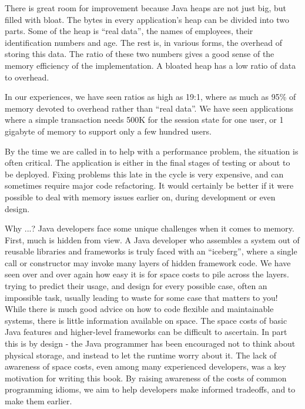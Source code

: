 There is great room for improvement because Java heaps are not just big, but
filled with bloat. The bytes in every application's heap can be divided into two
parts. Some of the heap is ``real data'', the names of employees, their
identification numbers and age. The rest is, in various forms, the overhead of
storing this data. The ratio of these two numbers gives a good sense of the
memory efficiency of the implementation. A bloated heap has a low ratio of data
to overhead.

In our experiences, we have seen ratios as high as 19:1, where as much as 95\%
of memory devoted to overhead rather than "`real data"'.
We have seen applications where a simple transaction needs 500K for the session
state for one user, or 1 gigabyte of memory to support only a few hundred users.

By the time we are called in to help with a performance problem, the situation
is often critical. The application is either in the final stages of testing or
about to be deployed. Fixing problems this late in the cycle is very expensive,
and can sometimes require major code refactoring. It would certainly be better
if it were possible to deal with memory issues earlier on, during development or
even design.

Why ...? Java developers face some unique challenges when it comes to memory.
First, much is hidden from view. A Java developer who assembles a system out of
reusable libraries and frameworks is truly faced with an "`iceberg"', where a
single call or constructor may invoke many layers of hidden framework code. We
have seen over and over again how easy it is for space costs to pile across the
layers. %
trying to predict their usage, and design for every possible case, often an
impossible task, usually leading to waste for some case that matters to you!
While there is much good advice on how to code flexible and maintainable
systems, there is little information available on space. The space costs of
basic Java features and higher-level frameworks can be difficult to ascertain.
In part this is by design - the Java programmer has been encouraged not to think
about physical storage, and instead to let the runtime worry about it. The lack
of awareness of space costs, even among many experienced developers, was a key
motivation for writing this book. By raising awareness of the costs of common
programming idioms, we aim to help developers make informed tradeoffs, and to
make them earlier.


